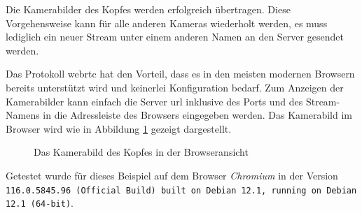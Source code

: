 \noindent Die Kamerabilder des Kopfes werden erfolgreich übertragen.
Diese Vorgehensweise kann für alle anderen Kameras wiederholt werden, es muss lediglich ein neuer Stream unter einem anderen
Namen an den Server gesendet werden.


Das Protokoll \gls{webrtc} hat den Vorteil, dass es in den meisten modernen Browsern bereits unterstützt wird und
keinerlei Konfiguration bedarf.
Zum Anzeigen der Kamerabilder kann einfach die Server \gls{url} inklusive des Ports und des Stream-Namens in die
Adressleiste des Browsers eingegeben werden.
Das Kamerabild im Browser wird wie in Abbildung \ref{fig:browser} gezeigt dargestellt.

\begin{figure}[h]
    \caption{Das Kamerabild des Kopfes in der Browseransicht}\label{fig:browser}
\end{figure}

Getestet wurde für dieses Beispiel auf dem Browser \emph{Chromium} in der Version
\texttt{116.0.5845.96 (Official Build) built on Debian 12.1, running on Debian 12.1 (64-bit)}.


